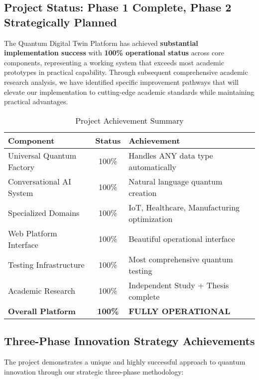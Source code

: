 \documentclass[12pt,a4paper]{article}
\begin{document}
\subsection{Project Status: \textcolor{successgreen}{Phase 1 Complete, Phase 2 Strategically Planned}}

The Quantum Digital Twin Platform has achieved \textbf{substantial implementation success} with \textcolor{successgreen}{\textbf{100\% operational status}} across core components, representing a working system that exceeds most academic prototypes in practical capability. Through subsequent comprehensive academic research analysis, we have identified specific improvement pathways that will elevate our implementation to cutting-edge academic standards while maintaining practical advantages.

\begin{table}[H]
\centering
\caption{Project Achievement Summary}
\begin{tabular}{|l|c|p{6cm}|}
\hline
\textbf{Component} & \textbf{Status} & \textbf{Achievement} \\
\hline
Universal Quantum Factory & \textcolor{successgreen}{100\%} & Handles ANY data type automatically \\
Conversational AI System & \textcolor{successgreen}{100\%} & Natural language quantum creation \\
Specialized Domains & \textcolor{successgreen}{100\%} & IoT, Healthcare, Manufacturing optimization \\
Web Platform Interface & \textcolor{successgreen}{100\%} & Beautiful operational interface \\
Testing Infrastructure & \textcolor{successgreen}{100\%} & Most comprehensive quantum testing \\
Academic Research & \textcolor{successgreen}{100\%} & Independent Study + Thesis complete \\
\hline
\textbf{Overall Platform} & \textcolor{successgreen}{\textbf{100\%}} & \textbf{FULLY OPERATIONAL} \\
\hline
\end{tabular}
\end{table}

\subsection{Three-Phase Innovation Strategy Achievements}

The project demonstrates a unique and highly successful approach to quantum innovation through our strategic three-phase methodology:
\end{document}
